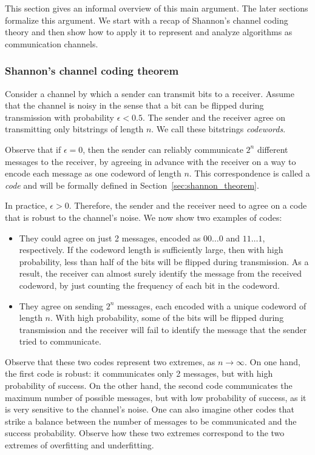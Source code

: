 This section gives an informal overview of this main argument. The later sections formalize this argument. We start with a recap of Shannon's channel coding theory and then show how to apply it to represent and analyze algorithms as communication channels.

\subsubsection*{Shannon's channel coding theorem}

Consider a channel by which a sender can transmit bits to a receiver. Assume that the channel is noisy in the sense that a bit can be flipped during transmission with probability $\epsilon < 0.5$. The sender and the receiver agree on transmitting only bitstrings of length $n$. We call these bitstrings \emph{codewords}. 

Observe that if $\epsilon = 0$, then the sender can reliably communicate $2^n$ different messages to the receiver, by agreeing in advance with the receiver on a way to encode each message as one codeword of length $n$. This correspondence is called a \emph{code} and will be formally defined in Section~\ref{sec:shannon_theorem}.

In practice, $\epsilon > 0$. Therefore, the sender and the receiver need to agree on a code that is robust to the channel's noise. We now show two examples of codes:

\begin{itemize}
\item They could agree on just 2 messages, encoded as $00\ldots0$ and $11\ldots 1$, respectively. If the codeword length is sufficiently large, then with high probability, less than half of the bits will be flipped during transmission. As a result, the receiver can almost surely identify the message from the received codeword, by just counting the frequency of each bit in the codeword.
\item They agree on sending $2^n$ messages, each encoded with a unique codeword of length $n$. With high probability, some of the bits will be flipped during transmission and the receiver will fail to identify the message that the sender tried to communicate.
\end{itemize}

Observe that these two codes represent two extremes, as $n \to \infty$. On one hand, the first code is robust: it communicates only 2 messages, but with high probability of success. On the other hand, the second code communicates the maximum number of possible messages, but with low probability of success, as it is very sensitive to the channel's noise. One can also imagine other codes that strike a balance between the number of messages to be communicated and the success probability. Observe how these two extremes correspond to the two extremes of overfitting and underfitting. 


